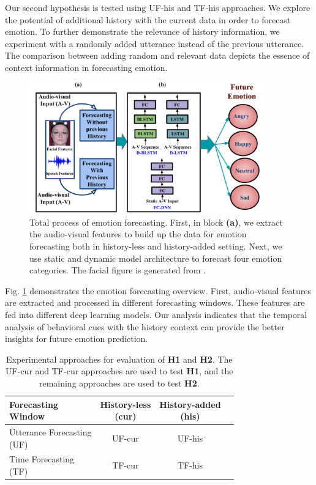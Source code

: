 Our second hypothesis is tested using UF-his and TF-his approaches. We explore the potential of additional history with the current data in order to forecast emotion. To further demonstrate the relevance of history information, we experiment with a randomly added utterance instead of the previous utterance. The comparison between adding random and relevant data depicts the essence of context information in forecasting emotion. 

\begin{figure}
\centering
   \includegraphics[width=0.9\textwidth]{overall.pdf}
\caption[Overall process of emotion forecasting]{Total process of emotion forecasting. First, in block \textbf{(a)}, we extract the audio-visual features to build up the data for emotion forecasting both in history-less and history-added setting. Next, we use static and dynamic model architecture to forecast four emotion categories. The facial figure is generated from \cite{IEMOCAP}.}
\label{fig:overview}
\end{figure}

Fig. \ref{fig:overview} demonstrates the emotion forecasting overview. First, audio-visual features are extracted and processed in different forecasting windows. These features are fed into different deep learning models. Our analysis indicates that the temporal analysis of behavioral cues with the history context can provide the better insights for future emotion prediction. 


\begin{table}[h]
\centering
\caption{Experimental approaches for evaluation of \textbf{H1} and \textbf{H2}. The UF-cur and TF-cur approaches are used to test \textbf{H1}, and the remaining approaches are used to test \textbf{H2}.}
\begin{tabular}{|l||c|c|c||}\hline
\diagbox[width=15em]{\textbf{Forecasting} \\ \textbf{Window}}{\makecell{{}\\\textbf{History}}} &
  \makecell{History-less \\(cur)} & \makecell{History-added \\(his)} \\ \hline
\hline
\makecell{Utterance Forecasting \\ (UF)} & UF-cur & UF-his\\
\hline
\makecell{Time Forecasting\\ (TF)} & TF-cur & TF-his  \\
\hline
\end{tabular}
\label{table:experiments}
\end{table}


